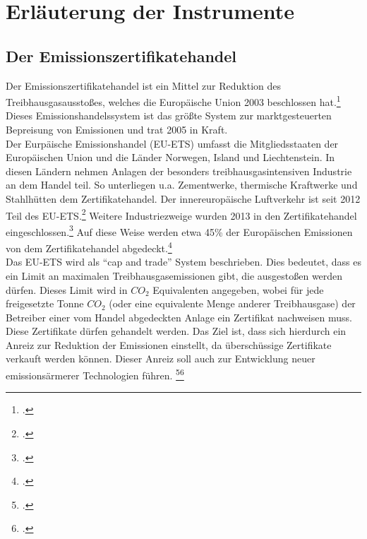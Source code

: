 \chapter{Erläuterung der Instrumente}
\section{Der Emissionszertifikatehandel}
Der Emissionszertifikatehandel ist ein Mittel zur Reduktion des Treibhausgasausstoßes, welches die Europäische Union 2003 beschlossen hat.\footcite[Vgl. auch im Folgenden][]{Buchner2007}
Dieses Emissionshandelssystem ist das größte System zur marktgesteuerten Bepreisung von Emissionen und trat 2005 in Kraft.\\
Der Eurpäische Emissionshandel (EU-ETS) umfasst die Mitgliedsstaaten der Europäischen Union und die Länder Norwegen, Island und Liechtenstein.
In diesen Ländern nehmen Anlagen der besonders treibhausgasintensiven Industrie an dem Handel teil.
So unterliegen u.a. Zementwerke, thermische Kraftwerke und Stahlhütten dem Zertifikatehandel. Der innereuropäische Luftverkehr ist seit 2012 Teil des EU-ETS.\footcite[Vgl.][]{Umweltbundesamt}
Weitere Industriezweige wurden 2013 in den Zertifikatehandel eingeschlossen.\footcite[Vgl.][]{Emissionshandelsstelle2015}
Auf diese Weise werden etwa 45\% der Europäischen Emissionen von dem Zertifikatehandel abgedeckt.\footcite[Vgl.][]{Komission}
\\
Das EU-ETS wird als \enquote{cap and trade} System beschrieben.
Dies bedeutet, dass es ein Limit an maximalen Treibhausgasemissionen gibt, die ausgestoßen werden dürfen.
Dieses Limit wird in $CO_2$ Equivalenten angegeben, wobei für jede freigesetzte Tonne $CO_2$ (oder eine equivalente Menge anderer Treibhausgase) der Betreiber einer vom Handel abgedeckten Anlage ein Zertifikat nachweisen muss.
Diese Zertifikate dürfen gehandelt werden.
Das Ziel ist, dass sich hierdurch ein Anreiz zur Reduktion der Emissionen einstellt, da überschüssige Zertifikate verkauft werden können.
Dieser Anreiz soll auch zur Entwicklung neuer emissionsärmerer Technologien führen.
\footcite[Vgl.][]{Umweltbundesamt}\footcite[Vgl.][]{Komission}
